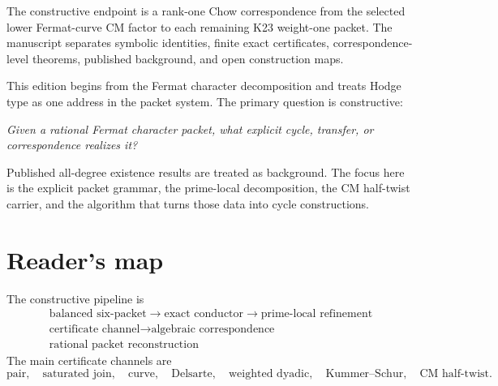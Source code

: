 \documentclass[11pt,oneside]{book}
\theoremstyle{definition}
\theoremstyle{remark}
\begin{document}
The constructive endpoint is a rank-one Chow correspondence from the selected lower Fermat-curve CM factor to each remaining K23 weight-one packet. The manuscript separates symbolic identities, finite exact certificates, correspondence-level theorems, published background, and open construction maps.

\begin{scopebox}
This edition begins from the Fermat character decomposition and treats Hodge type as one address in the packet system. The primary question is constructive:
\begin{center}\itshape
Given a rational Fermat character packet, what explicit cycle, transfer, or correspondence realizes it?
\end{center}
Published all-degree existence results are treated as background. The focus here is the explicit packet grammar, the prime-local decomposition, the CM half-twist carrier, and the algorithm that turns those data into cycle constructions.
\end{scopebox}

\chapter*{Reader's map}
The constructive pipeline is
\[
\boxed{\begin{gathered}
\text{balanced six-packet}\longrightarrow\text{exact conductor}\longrightarrow\text{prime-local refinement}\\
\text{certificate channel}\longrightarrow\text{algebraic correspondence}\\
\text{rational packet reconstruction}
\end{gathered}}
\]
The main certificate channels are
\[
\text{pair},\quad
\text{saturated join},\quad
\text{curve},\quad
\text{Delsarte},\quad
\text{weighted dyadic},\quad
\text{Kummer--Schur},\quad
\text{CM half-twist}.
\]
\end{document}
